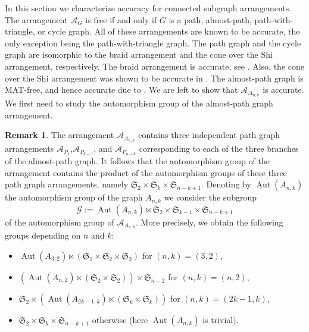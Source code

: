 \documentclass[12pt]{amsart}
\newcommand\CA{{\mathscr A}}
\newcommand\Aut{{\operatorname{Aut}}}
\numberwithin{equation}{section}
\theoremstyle{plain}
\theoremstyle{definition}
\newtheorem{remark}[equation]{Remark}
\begin{document}
In this section we characterize accuracy for connected subgraph arrangements. The arrangement $\CA_G$ is free if and only if $G$ is a path, almost-path, path-with-triangle, or cycle graph. All of these arrangements are known to be accurate, the only exception being the path-with-triangle graph. The path graph and the cycle graph are isomorphic to the braid arrangement and the cone over the Shi arrangement, respectively. The braid arrangement is accurate, see \cite[Thm.~1.6]{mueckschroehrle:accurate}. Also, the cone over the Shi arrangement was shown to be accurate in \cite[Thm.~1.8]{mueckschroehrle:accurate}. The almost-path graph is MAT-free, and hence accurate due to \cite[Thm.~1.2]{mueckschroehrle:accurate}. We are left to show that $\CA_{\Delta_{n,k}}$ is accurate. We first need to study the automorphism group of the almost-path graph arrangement.
\begin{remark}
	 The arrangement $\CA_{A_{n,k}}$ contains three independent path graph arrangements $\CA_{P_1}$,$\CA_{P_{k-1}}$, and $\CA_{P_{n-k}}$ corresponding to each of the three branches of the almost-path graph. It follows that the automorphism group of the arrangement contains the product of the automorphism groups of these three path graph arrangements, namely $\mathfrak{S}_2\times\mathfrak{S}_k\times\mathfrak{S}_{n-k+1}$. 
   Denoting by $\Aut(A_{n,k})$ the automorphism group of the graph $A_{n,k}$ we consider the subgroup  
   \begin{equation}
       \label{eq:ank}
          \mathcal G := \Aut(A_{n,k})\ltimes\mathfrak{S}_2\times\mathfrak{S}_{k-1}\times\mathfrak{S}_{n-k+1}
   \end{equation}
  of the automorphism group of $\CA_{A_{n,k}}$.
  More precisely, we obtain the following groups depending on $n$ and $k$:
	 \begin{itemize}
	 	\item $\Aut(A_{3,2})\ltimes(\mathfrak{S}_2\times\mathfrak{S}_2\times\mathfrak{S}_2)$ for $(n,k)=(3,2)$,
	 	\item $(\Aut(A_{n,2})\ltimes(\mathfrak{S}_2\times\mathfrak{S}_2))\times\mathfrak{S}_{n-2}$ for $(n,k)=(n,2)$,
	 	\item $\mathfrak{S}_2\times (\Aut(A_{2k-1,k})\ltimes(\mathfrak{S}_k\times\mathfrak{S}_k))$ for $(n,k)=(2k-1,k)$,
	 	\item $\mathfrak{S}_2\times\mathfrak{S}_k\times\mathfrak{S}_{n-k+1}$ otherwise (here $\Aut(A_{n,k})$ is trivial).
	 \end{itemize}
\end{remark}
\end{document}
